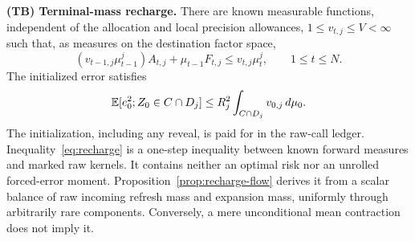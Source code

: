 \smallskip\noindent\textbf{(TB) Terminal-mass recharge.}
There are known measurable functions, independent of the allocation and local precision allowances, $1\le v_{t,j}\le V<\infty$ such that, as measures on the destination factor space,
\begin{equation}\label{eq:recharge}
 (v_{t-1,j}\mu_{t-1}^j)A_{t,j}+\mu_{t-1}F_{t,j}
       \le v_{t,j}\mu_t^j,\qquad 1\le t\le N.
\end{equation}
The initialized error satisfies
\begin{equation}\label{eq:bridge-seed}
 \mathbb E[e_0^2;Z_0\in C\cap D_j]\le R_j^2\int_{C\cap D_j}v_{0,j}\,d\mu_0.
\end{equation}
The initialization, including any reveal, is paid for in the raw-call ledger. Inequality~\eqref{eq:recharge} is a one-step inequality between known forward measures and marked raw kernels. It contains neither an optimal risk nor an unrolled forced-error moment. Proposition~\ref{prop:recharge-flow} derives it from a scalar balance of raw incoming refresh mass and expansion mass, uniformly through arbitrarily rare components. Conversely, a mere unconditional mean contraction does not imply it.

